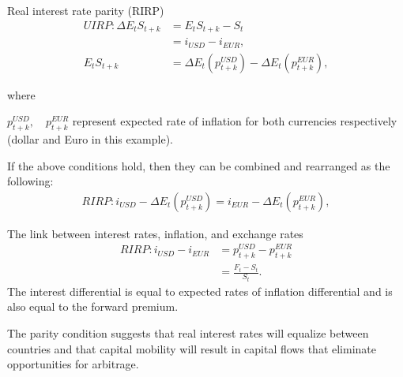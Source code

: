 \documentclass[international_finance_p2.tex]{subfiles}
\begin{document}
\begin{frame}{Real interest rate parity (RIRP)}
\begin{align}
UIRP:\Delta E_t S_{t+k}&=E_t S_{t+k}-S_t\nonumber \\
&=i_{USD}-i_{EUR},\\
E_t S_{t+k}&= \Delta E_t (p_{t+k}^{USD} ) - \Delta E_t (p_{t+k}^{EUR} ),
\end{align}

where

$p_{t+k}^{USD}, \quad p_{t+k}^{EUR}$ represent expected rate of inflation for both currencies respectively (dollar and Euro in this example).

If the above conditions hold, then they can be combined and rearranged as the following:
\begin{align}
RIRP:i_{USD} - \Delta E_t (p_{t+k}^{USD})=i_{EUR}- \Delta E_t (p_{t+k}^{EUR} ),
\end{align}
\end{frame}
\begin{frame}{The link between interest rates, inflation, and exchange rates}
\begin{align}
RIRP:i_{USD}-i_{EUR}&=p_{t+k}^{USD}-p_{t+k}^{EUR}\nonumber\\
&=\frac{F_t-S_t}{S_t}.
\end{align}
The interest differential is equal to expected rates of inflation differential and is also equal to the forward premium.

The parity condition suggests that real interest rates will equalize between countries and that capital mobility will result in capital flows that eliminate opportunities for arbitrage.
\end{frame}
\end{document}
